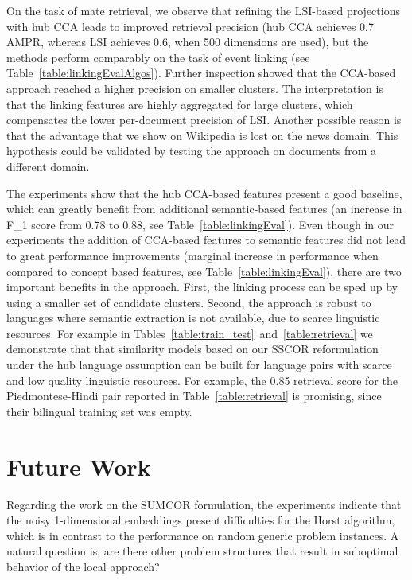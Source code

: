 On the task of mate retrieval, we observe that refining the LSI-based
projections with hub CCA leads to improved retrieval precision (hub CCA
achieves 0.7 AMPR, whereas LSI achieves 0.6, when 500 dimensions are used), but the
methods perform comparably on the task of event linking (see Table~\ref{table:linkingEvalAlgos}). 
Further inspection showed that the CCA-based approach reached a higher precision on smaller
clusters. The interpretation is that the linking features are highly
aggregated for large clusters, which compensates the lower per-document
precision of LSI. Another possible reason is that the advantage that we
show on Wikipedia is lost on the news domain. This hypothesis could be
validated by testing the approach on documents from a different domain.

The experiments show that the hub CCA-based features present a good baseline,
which can greatly benefit from additional semantic-based features (an increase
in F_1 score from 0.78 to 0.88, see Table~\ref{table:linkingEval}).
Even though in our experiments the addition of CCA-based features to semantic features did not
lead to great performance improvements (marginal increase in performance when compared
to concept based features, see Table~\ref{table:linkingEval}), there are two important benefits in the
approach. First, the linking process can be sped up by using a smaller set of
candidate clusters. Second, the approach is robust to languages where semantic
extraction is not available, due to scarce linguistic resources.
For example in Tables~\ref{table:train_test}~and~\ref{table:retrieval} we demonstrate
that that similarity models based on our SSCOR reformulation under the hub language
assumption can be built for language pairs with scarce and
low quality linguistic resources. For example, the 0.85 retrieval score
for the Piedmontese-Hindi pair reported in Table~\ref{table:retrieval} is
promising, since their bilingual training set was empty.

\section{Future Work}

Regarding the work on the SUMCOR formulation, the experiments indicate
that the noisy 1-dimensional embeddings present difficulties for the Horst
algorithm, which is in contrast to the performance on random generic problem instances. A natural
question is, are there other problem structures that result in suboptimal behavior of the local approach?

